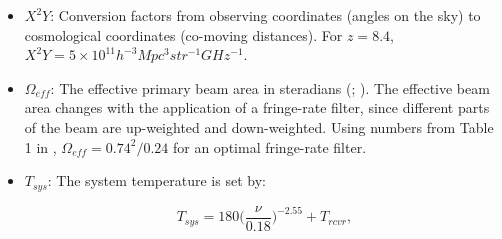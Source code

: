 \documentclass[preprint2,numberedappendix,tighten]{aastex6}  %
\begin{document}
\begin{itemize}
\item $X^{2}Y$: Conversion factors from observing coordinates (angles on the sky) to cosmological coordinates (co-moving 
distances). For $z=8.4$, $X^{2}Y = 5 \times 10^{11} h^{-3} Mpc^{3} str^{-1} GHz^{-1}$.
\item $\Omega_{eff}$: The effective primary beam area in steradians (\citealt{parsons_et_al2010}; \citealt{pober_et_al2012}). 
The effective beam area changes with the application of a fringe-rate filter, since different parts of the beam are up-weighted and down-weighted. Using numbers from Table 1 in \citet{parsons_et_al2016}, $\Omega_{eff} = 0.74^{2}/0.24$ for an optimal fringe-rate 
filter. 
\item $T_{sys}$: The system temperature is set by:

\begin{equation}
\label{eq:sys}
T_{sys} = 180\Big(\frac{\nu}{0.18}\Big)^{-2.55} + T_{rcvr},
\end{equation}


\end{itemize}
\end{document}
